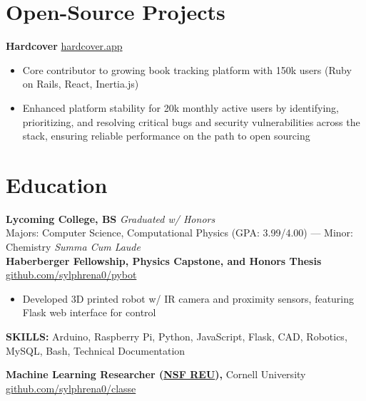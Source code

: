 \documentclass[11pt]{article}       %
\begin{document}
\vspace{-9pt}

\section*{Open-Source Projects}
\textbf{Hardcover} \hfill \href{https://hardcover.app/}{hardcover.app} \\
\vspace{-9pt}
\begin{itemize}
  \item Core contributor to growing book tracking platform with 150k users (Ruby on Rails, React, Inertia.js)
  \item Enhanced platform stability for 20k monthly active users by identifying, prioritizing, and resolving critical bugs and security vulnerabilities across the stack, ensuring reliable performance on the path to open sourcing
\end{itemize}

\vspace{-18.5pt}

\section*{Education}
\textbf{Lycoming College, BS} \hfill \textit{Graduated w/ Honors} \\
Majors: Computer Science, Computational Physics (GPA: 3.99/4.00) --- Minor: Chemistry \hfill \textit{Summa Cum Laude} \\

\vspace{9pt}
\textbf{Haberberger Fellowship, Physics Capstone, and Honors Thesis} \hfill \href{https://github.com/sylphrena0/pybot}{github.com/sylphrena0/pybot} \\
\vspace{-9pt}
\begin{itemize}[leftmargin=0.35in]
  \item Developed 3D printed robot w/ IR camera and proximity sensors, featuring Flask web interface for control
\end{itemize}
\vspace{-9pt}
\textbf{SKILLS:} Arduino, Raspberry Pi, Python, JavaScript, Flask, CAD, Robotics, MySQL, Bash, Technical Documentation
\vspace{9pt}


\textbf{Machine Learning Researcher (\href{https://new.nsf.gov/funding/initiatives/reu}{NSF REU}),} {Cornell University} \hfill \href{https://github.com/sylphrena0/classe}{github.com/sylphrena0/classe}
\end{document}

